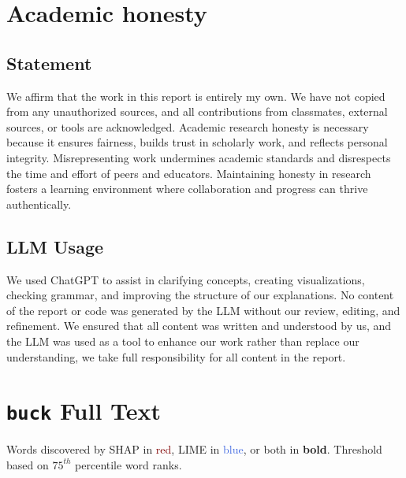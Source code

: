 \documentclass[10pt,letterpaper]{article}
\begin{document}
\newpage


\printbibliography

\appendix
\section{Academic honesty}
\subsection{Statement}
We affirm that the work in this report is entirely my own. We have not copied from any unauthorized sources, and all contributions from classmates, external sources, or tools are acknowledged. Academic research honesty is necessary because it ensures fairness, builds trust in scholarly work, and reflects personal integrity. Misrepresenting work undermines academic standards and disrespects the time and effort of peers and educators. Maintaining honesty in research fosters a learning environment where collaboration and progress can thrive authentically.

\subsection{LLM Usage}

We used ChatGPT to assist in clarifying concepts, creating visualizations, checking grammar, and improving the structure of our explanations. No content of the report or code was generated by the LLM without our review, editing, and refinement. We ensured that all content was written and understood by us, and the LLM was used as a tool to enhance our work rather than replace our understanding, we take full responsibility for all content in the report.

\newpage

\section{\texttt{buck} Full Text} \label{sec:buck_text}

Words discovered by SHAP in \textcolor{Maroon}{red}, LIME in \textcolor{RoyalBlue}{blue}, or both in \textbf{bold}. Threshold based on $75^{th}$ percentile word ranks.

\vspace{1em}
\noindent
\begin{minipage}{\textwidth}
\scriptsize %
\begin{spacing}{1.0} %

\end{spacing}
\end{minipage}
\vspace{1em}
\end{document}
